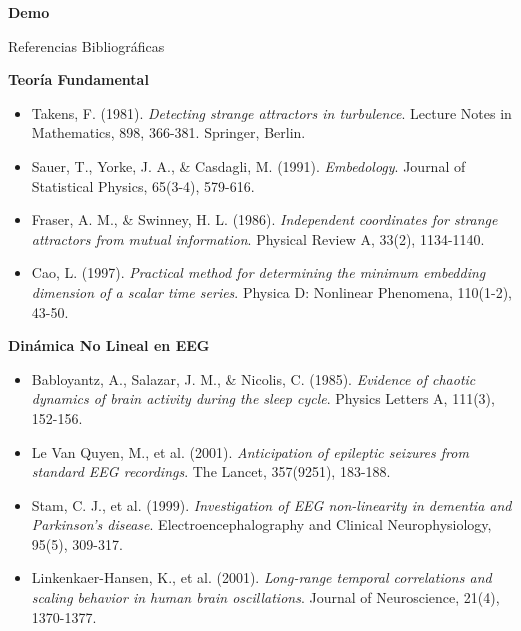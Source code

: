 \documentclass[10pt, aspectratio=169]{beamer} %
\begin{document}
\begin{frame}[standout]
    \Huge \textbf{Demo} \\
    \vspace{0.5cm}
\end{frame}
\begin{frame}[allowframebreaks]{Referencias Bibliográficas}
    \tiny %
    
    \textbf{Teoría Fundamental}
    \begin{itemize}
        \item Takens, F. (1981). \textit{Detecting strange attractors in turbulence}. Lecture Notes in Mathematics, 898, 366-381. Springer, Berlin.
        \item Sauer, T., Yorke, J. A., \& Casdagli, M. (1991). \textit{Embedology}. Journal of Statistical Physics, 65(3-4), 579-616.
        \item Fraser, A. M., \& Swinney, H. L. (1986). \textit{Independent coordinates for strange attractors from mutual information}. Physical Review A, 33(2), 1134-1140.
        \item Cao, L. (1997). \textit{Practical method for determining the minimum embedding dimension of a scalar time series}. Physica D: Nonlinear Phenomena, 110(1-2), 43-50.
    \end{itemize}

    \vspace{0.3cm}
    \textbf{Dinámica No Lineal en EEG}
    \begin{itemize}
        \item Babloyantz, A., Salazar, J. M., \& Nicolis, C. (1985). \textit{Evidence of chaotic dynamics of brain activity during the sleep cycle}. Physics Letters A, 111(3), 152-156.
        \item Le Van Quyen, M., et al. (2001). \textit{Anticipation of epileptic seizures from standard EEG recordings}. The Lancet, 357(9251), 183-188.
        \item Stam, C. J., et al. (1999). \textit{Investigation of EEG non-linearity in dementia and Parkinson's disease}. Electroencephalography and Clinical Neurophysiology, 95(5), 309-317.
        \item Linkenkaer-Hansen, K., et al. (2001). \textit{Long-range temporal correlations and scaling behavior in human brain oscillations}. Journal of Neuroscience, 21(4), 1370-1377.
    \end{itemize}


\end{frame}
\end{document}

